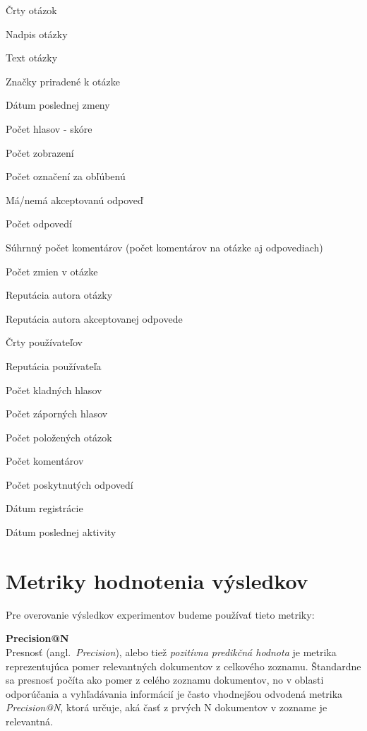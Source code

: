 \begin{my_itemize}
  \item Črty otázok
  \begin{my_itemize}
    \item Nadpis otázky
    \item Text otázky
    \item Značky priradené k otázke
    \item Dátum poslednej zmeny
    \item Počet hlasov - skóre
    \item Počet zobrazení
    \item Počet označení za obľúbenú
    \item Má/nemá akceptovanú odpoveď
    \item Počet odpovedí
    \item Súhrnný počet komentárov (počet komentárov na otázke aj odpovediach)
    \item Počet zmien v otázke
    \item Reputácia autora otázky
    \item Reputácia autora akceptovanej odpovede
  \end{my_itemize}
  \item Črty používateľov
  \begin{my_itemize}
    \item Reputácia používateľa
    \item Počet kladných hlasov
    \item Počet záporných hlasov
    \item Počet položených otázok
    \item Počet komentárov
    \item Počet poskytnutých odpovedí
    \item Dátum registrácie
    \item Dátum poslednej aktivity
  \end{my_itemize}
\end{my_itemize}

\section{Metriky hodnotenia výsledkov}

Pre overovanie výsledkov experimentov budeme používať tieto metriky:

\textbf{Precision@N}\\
Presnosť (angl.~\emph{Precision}), alebo tiež \textit{pozitívna predikčná hodnota} je metrika reprezentujúca pomer relevantných
dokumentov z celkového zoznamu. Štandardne sa presnosť počíta ako pomer z celého zoznamu dokumentov, no v oblasti
odporúčania a vyhľadávania informácií je často vhodnejšou odvodená metrika \textit{Precision@N}, ktorá určuje, aká časť
z prvých N dokumentov v zozname je relevantná.

